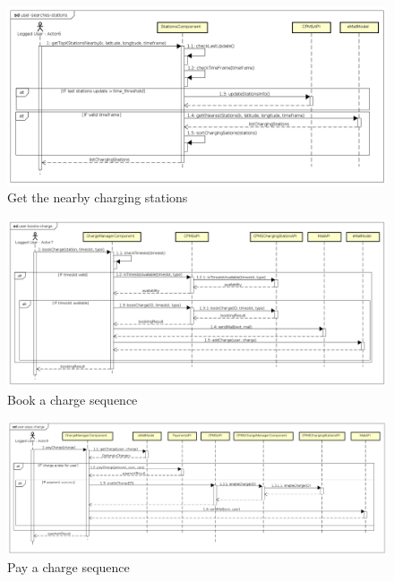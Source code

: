 \begin{figure}[!h]
    \begin{center}
        \includegraphics[keepaspectratio, width=16cm]{Sequence/user-searches-stations.png}
        \caption{Get the nearby charging stations}
        \label{fig:user-searches-stations}
    \end{center}
\end{figure}
\begin{figure}[!h]
    \begin{center}
        \includegraphics[keepaspectratio, width=16cm]{Sequence/user-books-charge.png}
        \caption{Book a charge sequence}
        \label{fig:user-books-charge}
    \end{center}
\end{figure}
\begin{figure}[!h]
    \begin{center}
        \includegraphics[keepaspectratio, width=16cm]{Sequence/user-pays-charge.png}
        \caption{Pay a charge sequence}
        \label{fig:user-pays-charge}
    \end{center}
\end{figure}
